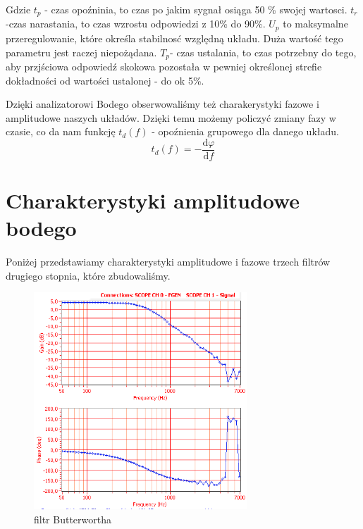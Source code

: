 \documentclass[a4paper,11pt]{article}
\begin{document}
Gdzie $t_p$ - czas opoźninia, to czas po jakim sygnał osiąga 50 \% swojej wartosci. $ t_r$ -czas narastania, to czas wzrostu odpowiedzi z 10\% do 90\%.   $U_p$ to maksymalne przeregulowanie, które określa stabilnosć względną układu. Duża wartość tego parametru jest raczej niepożądana. $T_p $- czas ustalania, to czas potrzebny do tego, aby przjściowa odpowiedź skokowa pozostała w pewniej określonej strefie dokładności od wartości ustalonej - do ok 5\%. 

Dzięki analizatorowi Bodego obserwowaliśmy też charakerystyki fazowe i amplitudowe naszych układów. Dzięki temu możemy policzyć zmiany fazy w czasie, co da nam funkcję $t_d(f)$ - opoźnienia grupowego dla danego układu.  
$$ t_d(f) = - \frac {\mbox{d}\varphi } {\mbox{d}f} $$ 



\section{Charakterystyki amplitudowe bodego}

Poniżej przedstawiamy charakterystyki amplitudowe i fazowe trzech filtrów drugiego stopnia, które zbudowaliśmy.

\begin{figure}[H]
\begin{center}
\includegraphics[width=8cm]{obrazki/batman1.PNG}
\end{center}
\caption{filtr Butterwortha}
\end{figure}
\end{document}
